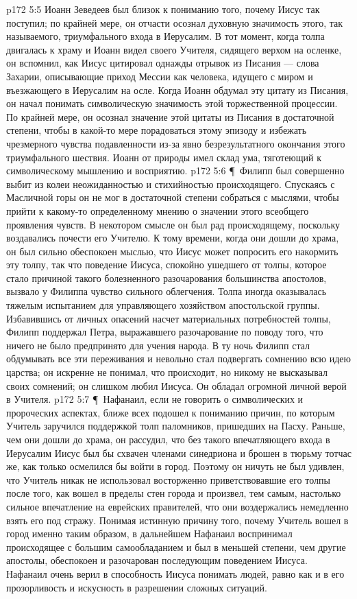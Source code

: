 \vs p172 5:5 Иоанн Зеведеев был близок к пониманию того, почему Иисус так поступил; по крайней мере, он отчасти осознал духовную значимость этого, так называемого, триумфального входа в Иерусалим. В тот момент, когда толпа двигалась к храму и Иоанн видел своего Учителя, сидящего верхом на осленке, он вспомнил, как Иисус цитировал однажды отрывок из Писания --- слова Захарии, описывающие приход Мессии как человека, идущего с миром и въезжающего в Иерусалим на осле. Когда Иоанн обдумал эту цитату из Писания, он начал понимать символическую значимость этой торжественной процессии. По крайней мере, он осознал значение этой цитаты из Писания в достаточной степени, чтобы в какой\hyp{}то мере порадоваться этому эпизоду и избежать чрезмерного чувства подавленности из\hyp{}за явно безрезультатного окончания этого триумфального шествия. Иоанн от природы имел склад ума, тяготеющий к символическому мышлению и восприятию.
\vs p172 5:6 \P\ Филипп был совершенно выбит из колеи неожиданностью и стихийностью происходящего. Спускаясь с Масличной горы он не мог в достаточной степени собраться с мыслями, чтобы прийти к какому\hyp{}то определенному мнению о значении этого всеобщего проявления чувств. В некотором смысле он был рад происходящему, поскольку воздавались почести его Учителю. К тому времени, когда они дошли до храма, он был сильно обеспокоен мыслью, что Иисус может попросить его накормить эту толпу, так что поведение Иисуса, спокойно ушедшего от толпы, которое стало причиной такого болезненного разочарования большинства апостолов, вызвало у Филиппа чувство сильного облегчения. Толпа иногда оказывалась тяжелым испытанием для управляющего хозяйством апостольской группы. Избавившись от личных опасений насчет материальных потребностей толпы, Филипп поддержал Петра, выражавшего разочарование по поводу того, что ничего не было предпринято для учения народа. В ту ночь Филипп стал обдумывать все эти переживания и невольно стал подвергать сомнению всю идею царства; он искренне не понимал, что происходит, но никому не высказывал своих сомнений; он слишком любил Иисуса. Он обладал огромной личной верой в Учителя.
\vs p172 5:7 \P\ Нафанаил, если не говорить о символических и пророческих аспектах, ближе всех подошел к пониманию причин, по которым Учитель заручился поддержкой толп паломников, пришедших на Пасху. Раньше, чем они дошли до храма, он рассудил, что без такого впечатляющего входа в Иерусалим Иисус был бы схвачен членами синедриона и брошен в тюрьму тотчас же, как только осмелился бы войти в город. Поэтому он ничуть не был удивлен, что Учитель никак не использовал восторженно приветствовавшие его толпы после того, как вошел в пределы стен города и произвел, тем самым, настолько сильное впечатление на еврейских правителей, что они воздержались немедленно взять его под стражу. Понимая истинную причину того, почему Учитель вошел в город именно таким образом, в дальнейшем Нафанаил воспринимал происходящее с большим самообладанием и был в меньшей степени, чем другие апостолы, обеспокоен и разочарован последующим поведением Иисуса. Нафанаил очень верил в способность Иисуса понимать людей, равно как и в его прозорливость и искусность в разрешении сложных ситуаций.
